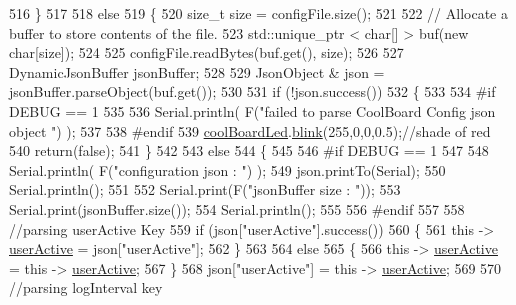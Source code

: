 \begin{DoxyCode}
516     \}
517 
518     \textcolor{keywordflow}{else}
519     \{
520         \textcolor{keywordtype}{size\_t} size = configFile.size();
521 
522         \textcolor{comment}{// Allocate a buffer to store contents of the file.}
523         std::unique\_ptr < char[] > buf(\textcolor{keyword}{new} \textcolor{keywordtype}{char}[size]);
524 
525         configFile.readBytes(buf.get(), size);
526 
527         DynamicJsonBuffer jsonBuffer;
528 
529         JsonObject & json = jsonBuffer.parseObject(buf.get());
530 
531         \textcolor{keywordflow}{if} (!json.success())
532         \{
533         
534 \textcolor{preprocessor}{        #if DEBUG == 1}
535 
536             Serial.println( F(\textcolor{stringliteral}{"failed to parse CoolBoard Config json object "}) );
537     
538 \textcolor{preprocessor}{        #endif}
539             \hyperlink{classCoolBoard_a1b1d3c684a5baa56b08486e192fd8e97}{coolBoardLed}.\hyperlink{classCoolBoardLed_a96e1ea13003eee34c9dbcef340404426}{blink}(255,0,0,0.5);\textcolor{comment}{//shade of red     }
540             \textcolor{keywordflow}{return}(\textcolor{keyword}{false});
541         \}
542 
543         \textcolor{keywordflow}{else}
544         \{   
545         
546 \textcolor{preprocessor}{        #if DEBUG == 1}
547             
548             Serial.println( F(\textcolor{stringliteral}{"configuration json : "}) );
549             json.printTo(Serial);
550             Serial.println();
551             
552             Serial.print(F(\textcolor{stringliteral}{"jsonBuffer size : "}));
553             Serial.print(jsonBuffer.size());
554             Serial.println();
555 
556 \textcolor{preprocessor}{        #endif}
557             
558             \textcolor{comment}{//parsing userActive Key}
559             \textcolor{keywordflow}{if} (json[\textcolor{stringliteral}{"userActive"}].success())
560             \{
561                 \textcolor{keyword}{this} -> \hyperlink{classCoolBoard_a6395459131d6889a3005f79c7a35e964}{userActive} = json[\textcolor{stringliteral}{"userActive"}];
562             \}
563 
564             \textcolor{keywordflow}{else}
565             \{
566                 \textcolor{keyword}{this} -> \hyperlink{classCoolBoard_a6395459131d6889a3005f79c7a35e964}{userActive} = \textcolor{keyword}{this} -> \hyperlink{classCoolBoard_a6395459131d6889a3005f79c7a35e964}{userActive};
567             \}
568             json[\textcolor{stringliteral}{"userActive"}] = \textcolor{keyword}{this} -> \hyperlink{classCoolBoard_a6395459131d6889a3005f79c7a35e964}{userActive};
569 
570             \textcolor{comment}{//parsing logInterval key}

\end{DoxyCode}
